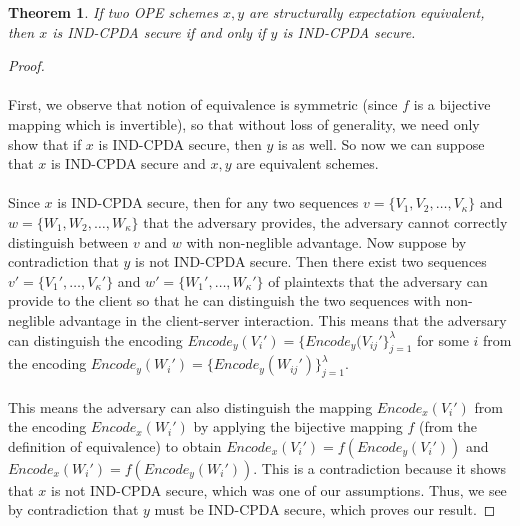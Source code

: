 \documentclass[12pt]{article}
\newtheorem{theorem}{Theorem}[section]
\begin{document}
\begin{theorem}
 If two OPE schemes $x,y$ are structurally expectation equivalent, then $x$ is IND-CPDA secure if and only if $y$ is IND-CPDA secure.
\end{theorem}
\begin{proof} \\ \\
First, we observe that notion of equivalence is symmetric (since $f$ is a bijective mapping which is invertible), so that without loss of generality, we need only show that if $x$ is IND-CPDA secure, then $y$ is as well. So now we can suppose that $x$ is IND-CPDA secure and $x,y$ are equivalent schemes. \\ \\
Since $x$ is IND-CPDA secure, then for any two sequences $v = \{V_1, V_2, \ldots, V_{\kappa}\}$ and $w = \{W_1, W_2, \ldots, W_{\kappa} \}$ that the adversary provides, the adversary cannot correctly distinguish between $v$ and $w$ with non-neglible advantage. Now suppose by contradiction that $y$ is not IND-CPDA secure. Then there exist two sequences $v' = \{V_1', \ldots, V_{\kappa}'\}$ and $w' = \{W_1', \ldots, W_{\kappa}'\}$ of plaintexts that the adversary can provide to the client so that he can distinguish the two sequences with non-neglible advantage in the client-server interaction. This means that the adversary can distinguish the encoding $Encode_y(V_i') = \{Encode_y(V_{ij}' \}_{j=1}^{\lambda}$ for some $i$ from the encoding $Encode_y(W_i') = \{Encode_y(W_{ij}') \}_{j=1}^{\lambda}$. \\ \\
This means the adversary can also distinguish the mapping $Encode_x(V_i')$ from the encoding $Encode_x(W_i')$ by applying the bijective mapping $f$ (from the definition of equivalence) to obtain $Encode_x(V_i') = f(Encode_y(V_i'))$ and $Encode_x(W_i') = f(Encode_y(W_i'))$. This is a contradiction because it shows that $x$ is not IND-CPDA secure, which was one of our assumptions. Thus, we see by contradiction that $y$ must be IND-CPDA secure, which proves our result.
\end{proof}
\end{document}
